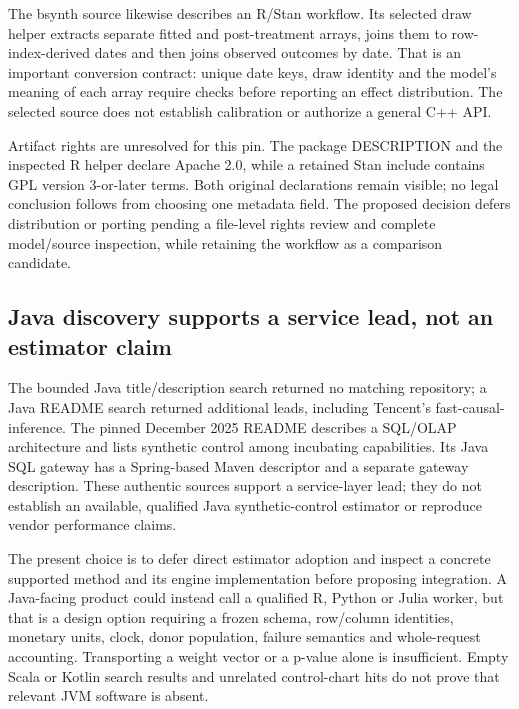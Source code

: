 The bsynth source likewise describes an R/Stan workflow. Its selected draw
helper extracts separate fitted and post-treatment arrays, joins them to
row-index-derived dates and then joins observed outcomes by date. That is
an important conversion contract: unique date keys, draw identity and
the model's meaning of each array require checks before reporting an
effect distribution. The selected source does not establish calibration
or authorize a general C++ API.~\citep{exec25_synthcross_bsynth}

Artifact rights are unresolved for this pin. The package DESCRIPTION and
the inspected R helper declare Apache 2.0, while a retained Stan include
contains GPL version 3-or-later terms. Both original declarations remain
visible; no legal conclusion follows from choosing one metadata field.
The proposed decision defers distribution or porting pending a file-level
rights review and complete model/source inspection, while retaining the
workflow as a comparison candidate.~\citep{exec25_synthcross_bsynth}

\subsection{Java discovery supports a service lead, not an estimator claim}
The bounded Java title/description search returned no matching repository;
a Java README search returned additional leads, including Tencent's
fast-causal-inference. The pinned December 2025 README describes a SQL/OLAP
architecture and lists synthetic control among incubating capabilities.
Its Java SQL gateway has a Spring-based Maven descriptor and a separate
gateway description. These authentic sources support a service-layer lead;
they do not establish an available, qualified Java synthetic-control
estimator or reproduce vendor performance claims.~\citep{exec25_synthcross_tencent}

The present choice is to defer direct estimator adoption and inspect a
concrete supported method and its engine implementation before proposing
integration. A Java-facing product could instead call a qualified R,
Python or Julia worker, but that is a design option requiring a frozen
schema, row/column identities, monetary units, clock, donor population,
failure semantics and whole-request accounting. Transporting a weight
vector or a p-value alone is insufficient. Empty Scala or Kotlin search
results and unrelated control-chart hits do not prove that relevant JVM
software is absent.~\citep{exec25_synthcross_choice}


